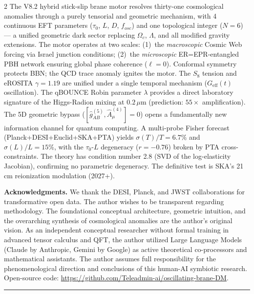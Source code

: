 \documentclass[11pt]{article}
\begin{document}
\begin{multicols}{2}
The V8.2 hybrid stick-slip brane motor resolves thirty-one cosmological anomalies through a purely tensorial and geometric mechanism, with 4 continuous EFT parameters ($\tau_0$, $L$, $D$, $f_{osc}$) and one topological integer ($N=6$) --- a unified geometric dark sector replacing $\Omega_c$, $\Lambda$, and all modified gravity extensions. The motor operates at two scales: (1)~the \textit{macroscopic} Cosmic Web forcing via Israel junction conditions; (2)~the \textit{microscopic} ER=EPR-entangled PBH network ensuring global phase coherence ($\ell=0$). Conformal symmetry protects BBN; the QCD trace anomaly ignites the motor. The $S_8$ tension and eROSITA $\gamma = 1.19$ are unified under a single temporal mechanism ($G_\text{eff}(t)$ oscillation). The qBOUNCE Robin parameter $\lambda$ provides a direct laboratory signature of the Higgs-Radion mixing at $0.2\,\mu$m (prediction: $55\times$ amplification). The 5D geometric bypass ($[\hat{g}_{AB}^{(5)}, \hat{A}_\mu^{(4)}] = 0$) opens a fundamentally new information channel for quantum computing. A multi-probe Fisher forecast (Planck+DESI+Euclid+SKA+PTA) yields $\sigma(T)/T = 6.7\%$ and $\sigma(L)/L = 15\%$, with the $\tau_0$-$L$ degeneracy ($r = -0.76$) broken by PTA cross-constraints. The theory has condition number 2.8 (SVD of the log-elasticity Jacobian), confirming no parametric degeneracy. The definitive test is SKA's 21\,cm reionization modulation (2027+).

\vspace{6pt}
\textbf{Acknowledgments.} We thank the DESI, Planck, and JWST collaborations for transformative open data. The author wishes to be transparent regarding methodology. The foundational conceptual architecture, geometric intuition, and the overarching synthesis of cosmological anomalies are the author's original vision. As an independent conceptual researcher without formal training in advanced tensor calculus and QFT, the author utilized Large Language Models (Claude by Anthropic, Gemini by Google) as active theoretical co-processors and mathematical assistants. The author assumes full responsibility for the phenomenological direction and conclusions of this human-AI symbiotic research. Open-source code: \url{https://github.com/Teleadmin-ai/oscillating-brane-DM}.

\end{multicols}

\vspace{4pt}
\hrule
\vspace{4pt}
\end{document}
